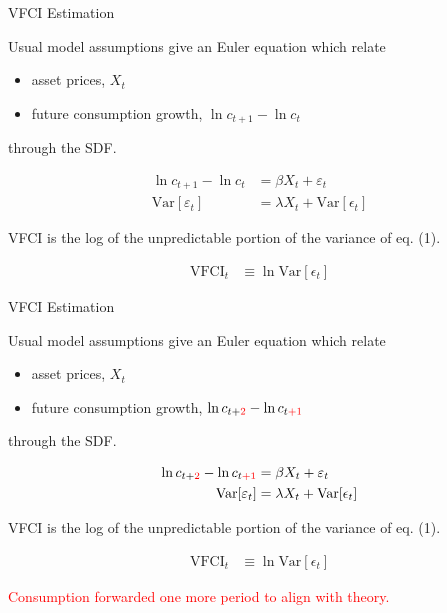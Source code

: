 \begin{frame}{VFCI Estimation}

  Usual model assumptions give an Euler equation which relate
  \begin{itemize}
    \item asset prices, $X_t$
    \item future consumption growth, $\ln c_{t+1} - \ln c_t$
  \end{itemize}
  through the SDF.

  \vspace{-1cm}
  \begin{align}
    \ln c_{t+1} - \ln c_t &= \beta X_t + \varepsilon_t
    \\
    \text{Var}[\varepsilon_t] &= \lambda X_t + \text{Var}[\epsilon_t]
  \end{align}

  VFCI is the log of the unpredictable portion of the variance of eq. (1).

  \vspace{-1cm}
  \setcounter{equation}{0}
  \begin{align*}
    \text{VFCI}_t &\equiv \ln \text{Var}[\epsilon_t]
  \end{align*}

\end{frame}


\begin{frame}{VFCI Estimation}

  Usual model assumptions give an Euler equation which relate
  \begin{itemize}
    \item asset prices, $X_t$
    \item future consumption growth, $\ln c_{t+\textcolor{red}{2}} - \ln c_{t\textcolor{red}{+1}}$
  \end{itemize}
  through the SDF.

  \vspace{-1cm}
  \setcounter{equation}{0}
  \begin{align}
    \ln c_{t+\textcolor{red}{2}} - \ln c_{t\textcolor{red}{+1}} &= \beta X_t + \varepsilon_t
    \\
    \text{Var}[\varepsilon_t] &= \lambda X_t + \text{Var}[\epsilon_t]
  \end{align}

  VFCI is the log of the unpredictable portion of the variance of eq. (1).

  \vspace{-1cm}
  \begin{align*}
    \text{VFCI}_t &\equiv \ln \text{Var}[\epsilon_t]
  \end{align*}

  \textcolor{red}{Consumption forwarded one more period to align with theory.}

\end{frame}


